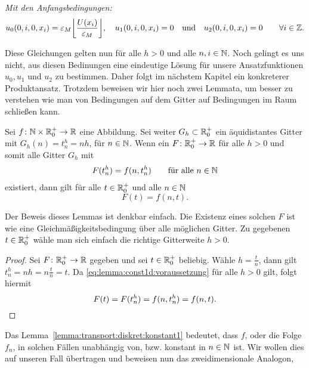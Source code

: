 \vspace{0.4cm}
\noindent \emph{Mit den Anfangsbedingungen:}
\begin{align}\label{eq:transport:diskret:anfangsbedinungen}
u_0(0, i, 0, x_i) = \rd{U(x_i)}, \quad u_1(0, i, 0, x_i) = 0 \quad \text{und} \quad u_2(0, i, 0, x_i) = 0 \qquad \forall i \in \Z.
\end{align}

Diese Gleichungen gelten nun für alle $h > 0$ und alle $n, i \in \mathbb N$.
Noch gelingt es uns nicht, aus diesen Bedinungen eine eindeutige Lösung für unsere Ansatzfunktionen $u_0, u_1$ und $u_2$ zu bestimmen.
Daher folgt im nächstem Kapitel ein konkreterer Produktansatz.
Trotzdem beweisen wir hier noch zwei Lemmata, um besser zu verstehen wie man von Bedingungen auf dem Gitter auf Bedingungen im Raum schließen kann.

\begin{lemma} \label{lemma:transport:diskret:konstant1}
Sei $f\colon \mathbb N \times \mathbb R^+_0 \to \mathbb R$ eine Abbildung.
Sei weiter $G_h \subset \mathbb R^+_0$ ein äquidistantes Gitter mit $G_h(n) = t^h_n = n h$, für $n \in \mathbb N$.
Wenn ein $F\colon \mathbb R^+_0 \to \mathbb R$ für alle $h > 0$ und somit alle Gitter $G_h$ mit
\begin{align}\label{eq:lemma:const1d:voraussetzung}
F(t^h_n) = f(n, t^h_n) \qquad \text{für alle $n \in \mathbb N$}
\end{align}
existiert, dann gilt für alle $t \in \mathbb R^+_0$ und alle $n \in \mathbb N$
\[ F(t) = f(n, t). \]
\end{lemma}
Der Beweis dieses Lemmas ist denkbar einfach. Die Existenz eines solchen $F$ ist wie eine Gleichmäßigkeitsbedingung über alle möglichen Gitter.
Zu gegebenen $t \in \mathbb R^+_0$ wähle man sich einfach die richtige Gitterweite $h > 0$.
\begin{proof}
Sei $F\colon \mathbb R^+_0 \to \mathbb R$ gegeben und sei $t \in \mathbb R^+_0$ beliebig.
Wähle $h = \frac{t}{n}$, dann gilt $t^h_n = nh = n \frac{t}{n} = t$.
Da \eqref{eq:lemma:const1d:voraussetzung} für alle $h > 0$ gilt, folgt hiermit 
\[ F(t) = F(t^h_n) = f(n, t^h_n) = f(n, t). \qedhere \]
\end{proof}

Das Lemma~\ref{lemma:transport:diskret:konstant1} bedeutet, dass $f$, oder die Folge $f_n$, in solchen Fällen unabhängig von, bzw. konstant in $n \in \mathbb N$ ist.
Wir wollen dies auf unseren Fall übertragen und beweisen nun das zweidimensionale Analogon, 


